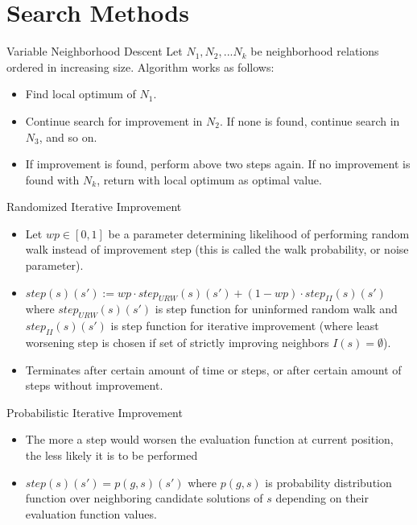 \documentclass{beamer}
\begin{document}
\section{Search Methods}

\begin{frame}{Variable Neighborhood Descent}
Let $N_1, N_2, ... N_k$ be neighborhood relations ordered in increasing size.  Algorithm works as follows:
\begin{itemize}
    \item Find local optimum of $N_1$.
    \item Continue search for improvement in $N_2$.  If none is found, continue search in $N_3$, and so on.
    \item If improvement is found, perform above two steps again.  If no improvement is found with $N_k$, return with local optimum as optimal value.
\end{itemize}
\end{frame}

\begin{frame}{Randomized Iterative Improvement}
\begin{itemize}
    \item Let $wp \in [0, 1]$ be a parameter determining likelihood of performing random walk instead of improvement step (this is called the walk probability, or noise parameter).
    \item $step(s)(s') := wp \cdot step_{URW}(s)(s') + (1-wp) \cdot step_{II}(s)(s')$ where $step_{URW}(s)(s')$ is step function for uninformed random walk and $step_{II}(s)(s')$ is step function for iterative improvement (where least worsening step is chosen if set of strictly improving neighbors $I(s) = \emptyset$).
    \item Terminates after certain amount of time or steps, or after certain amount of steps without improvement.
\end{itemize}
\end{frame}

\begin{frame}{Probabilistic Iterative Improvement}
\begin{itemize}
    \item The more a step would worsen the evaluation function at current position, the less likely it is to be performed
    \item $step(s)(s') = p(g, s)(s')$ where $p(g, s)$ is probability distribution function over neighboring candidate solutions of $s$ depending on their evaluation function values.
\end{itemize}
\end{frame}
\end{document}
